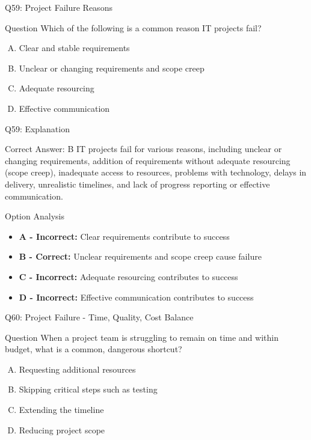 \documentclass{beamer}
\begin{document}
	\begin{frame}{Q59: Project Failure Reasons}
		\begin{block}{Question}
			Which of the following is a common reason IT projects fail?
		\end{block}
		\begin{enumerate}[(A)]
			\item Clear and stable requirements
			\item Unclear or changing requirements and scope creep
			\item Adequate resourcing
			\item Effective communication
		\end{enumerate}
	\end{frame}
	
	\begin{frame}{Q59: Explanation}
		\begin{block}{Correct Answer: B}
			IT projects fail for various reasons, including unclear or changing requirements, addition of requirements without adequate resourcing (scope creep), inadequate access to resources, problems with technology, delays in delivery, unrealistic timelines, and lack of progress reporting or effective communication.
		\end{block}
		\begin{block}{Option Analysis}
			\begin{itemize}
				\item \textbf{A - Incorrect:} Clear requirements contribute to success
				\item \textbf{B - Correct:} Unclear requirements and scope creep cause failure
				\item \textbf{C - Incorrect:} Adequate resourcing contributes to success
				\item \textbf{D - Incorrect:} Effective communication contributes to success
			\end{itemize}
		\end{block}
	\end{frame}
	
	\begin{frame}{Q60: Project Failure - Time, Quality, Cost Balance}
		\begin{block}{Question}
			When a project team is struggling to remain on time and within budget, what is a common, dangerous shortcut?
		\end{block}
		\begin{enumerate}[(A)]
			\item Requesting additional resources
			\item Skipping critical steps such as testing
			\item Extending the timeline
			\item Reducing project scope
		\end{enumerate}
	\end{frame}
	
\end{document}
